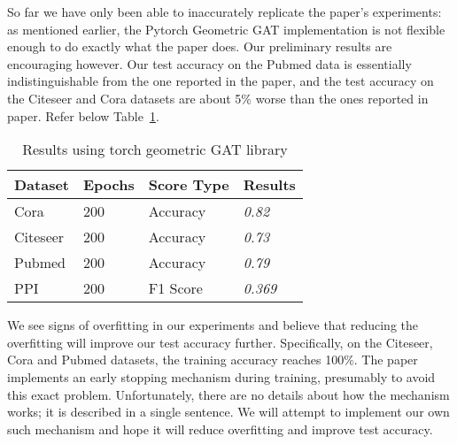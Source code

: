 So far we have only been able to inaccurately replicate the paper's
experiments: as mentioned earlier, the Pytorch Geometric GAT implementation is
not flexible enough to do exactly what the paper does.
Our preliminary results are encouraging however.
Our test accuracy on the Pubmed data is essentially
indistinguishable from the one reported in the paper, and the test accuracy on
the Citeseer and Cora datasets are about 5\% worse than the ones reported in
paper.
Refer below Table~\ref{tab:results-table}.

\begin{table}[]
    \centering
    \begin{tabular}{@{}llll@{}}
        \toprule
        \textbf{Dataset} & \textbf{Epochs} & \textbf{Score Type} & \textbf{Results} \\
        \midrule
        Cora             & 200             & Accuracy            & \textit{0.82}    \\
        Citeseer         & 200             & Accuracy            & \textit{0.73}    \\
        Pubmed           & 200             & Accuracy            & \textit{0.79}    \\
        PPI              & 200             & F1 Score            & \textit{0.369}   \\
        \bottomrule

    \end{tabular}
    \caption{Results using torch geometric GAT library}
    \label{tab:results-table}
\end{table}

We see signs of overfitting in our experiments and believe that reducing the
overfitting will improve our test accuracy further.
Specifically, on the Citeseer, Cora and Pubmed datasets, the training accuracy reaches 100\%.
The paper implements an early stopping mechanism during training, presumably to
avoid this exact problem.
Unfortunately, there are no details about how the mechanism works;
it is described in a single sentence.
We will attempt to implement our own such mechanism and hope it will reduce overfitting and
improve test accuracy.
